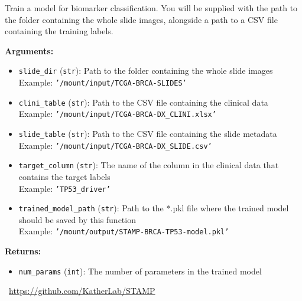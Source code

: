 \begin{tcolorbox}[title={\texttt{stamp\_train\_classification\_model}}]
Train a model for biomarker classification. You will be supplied with the path to the folder containing the whole slide images, alongside a path to a CSV file containing the training labels.

\vspace{.5em}
\textbf{Arguments:}
\begin{itemize}[topsep=0pt,parsep=-1pt,partopsep=0pt]
\item \texttt{slide\_dir} (\texttt{str}): Path to the folder containing the whole slide images\\  Example: \texttt{'/mount/input/TCGA-BRCA-SLIDES'}
\item \texttt{clini\_table} (\texttt{str}): Path to the CSV file containing the clinical data\\  Example: \texttt{'/mount/input/TCGA-BRCA-DX\_CLINI.xlsx'}
\item \texttt{slide\_table} (\texttt{str}): Path to the CSV file containing the slide metadata\\  Example: \texttt{'/mount/input/TCGA-BRCA-DX\_SLIDE.csv'}
\item \texttt{target\_column} (\texttt{str}): The name of the column in the clinical data that contains the target labels\\  Example: \texttt{'TP53\_driver'}
\item \texttt{trained\_model\_path} (\texttt{str}): Path to the *.pkl file where the trained model should be saved by this function\\  Example: \texttt{'/mount/output/STAMP-BRCA-TP53-model.pkl'}
\end{itemize}

\vspace{.5em}
\textbf{Returns:} \begin{itemize}[topsep=0pt,parsep=-1pt,partopsep=0pt]
\item \texttt{num\_params} (\texttt{int}): The number of parameters in the trained model
\end{itemize}
\tcblower
\setlength{\hangindent}{\widthof{\faGithub~}}
\faGithub~\url{https://github.com/KatherLab/STAMP}

\vspace{.5em}\setlength{\hangindent}{\widthof{\faFile*[regular]~}}\faFile*[regular]~


\end{tcolorbox}

